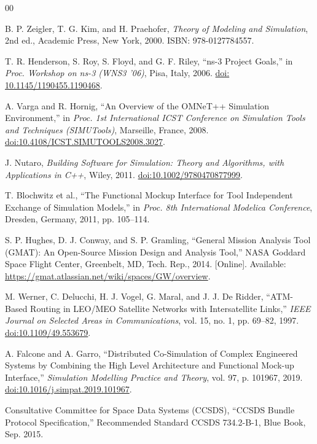 \documentclass[a4paper,fleqn]{cas-sc}
\begin{document}
\begin{thebibliography}{00}

 B. P. Zeigler, T. G. Kim, and H. Praehofer, \textit{Theory of Modeling and Simulation}, 2nd ed., Academic Press, New York, 2000. ISBN: 978-0127784557.

 T. R. Henderson, S. Roy, S. Floyd, and G. F. Riley, ``ns-3 Project Goals,'' in \textit{Proc. Workshop on ns-3 (WNS3 '06)}, Pisa, Italy, 2006. \href{https://doi.org/10.1145/1190455.1190468}{doi: 10.1145/1190455.1190468}.

 A. Varga and R. Hornig, ``An Overview of the OMNeT++ Simulation Environment,'' in \textit{Proc. 1st International ICST Conference on Simulation Tools and Techniques (SIMUTools)}, Marseille, France, 2008. \href{https://doi.org/10.4108/ICST.SIMUTOOLS2008.3027}{doi:10.4108/ICST.SIMUTOOLS2008.3027}.

 J. Nutaro, \textit{Building Software for Simulation: Theory and Algorithms, with Applications in C++}, Wiley, 2011. \href{https://doi.org/10.1002/9780470877999}{doi:10.1002/9780470877999}.

 T. Blochwitz et al., ``The Functional Mockup Interface for Tool Independent Exchange of Simulation Models,'' in \textit{Proc. 8th International Modelica Conference}, Dresden, Germany, 2011, pp. 105--114.

 S. P. Hughes, D. J. Conway, and S. P. Gramling, ``General Mission Analysis Tool (GMAT): An Open-Source Mission Design and Analysis Tool,'' NASA Goddard Space Flight Center, Greenbelt, MD, Tech. Rep., 2014. [Online]. Available: \url{https://gmat.atlassian.net/wiki/spaces/GW/overview}.

 M. Werner, C. Delucchi, H. J. Vogel, G. Maral, and J. J. De Ridder, ``ATM-Based Routing in LEO/MEO Satellite Networks with Intersatellite Links,'' \textit{IEEE Journal on Selected Areas in Communications}, vol. 15, no. 1, pp. 69--82, 1997. \href{https://doi.org/10.1109/49.553679}{doi:10.1109/49.553679}.

 A. Falcone and A. Garro, ``Distributed Co-Simulation of Complex Engineered Systems by Combining the High Level Architecture and Functional Mock-up Interface,'' \textit{Simulation Modelling Practice and Theory}, vol. 97, p. 101967, 2019. \href{https://doi.org/10.1016/j.simpat.2019.101967}{doi:10.1016/j.simpat.2019.101967}.

 Consultative Committee for Space Data Systems (CCSDS), ``CCSDS Bundle Protocol Specification,'' Recommended Standard CCSDS 734.2-B-1, Blue Book, Sep. 2015.


\end{thebibliography}
\end{document}
